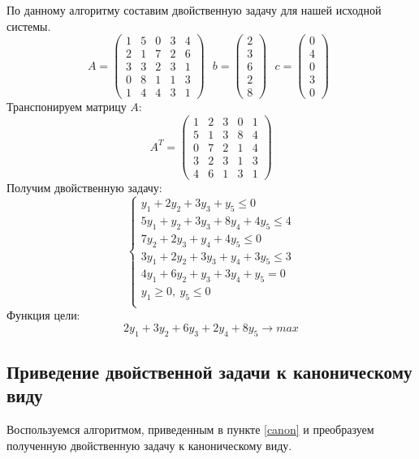 \documentclass{article}
\begin{document}
\noindent По данному алгоритму составим двойственную задачу для нашей исходной системы.
\begin{equation*}
A =
\begin{pmatrix}
1 & 5 & 0 & 3 & 4\\
2 & 1 & 7 & 2 & 6\\
3 & 3 & 2 & 3 & 1\\
0 & 8 & 1 & 1 & 3\\
1 & 4 & 4 & 3 & 1
\end{pmatrix} ~~~
b =
\begin{pmatrix}
2\\3\\6\\2\\8
\end{pmatrix} ~~~
c =
\begin{pmatrix}
0\\4\\0\\3\\0
\end{pmatrix} ~~
\end{equation*}
Транспонируем матрицу $A$:
\begin{equation*}
A^T = 
\begin{pmatrix}
1 & 2 & 3 & 0 & 1\\
5 & 1 & 3 & 8 & 4\\
0 & 7 & 2 & 1 & 4\\
3 & 2 & 3 & 1 & 3\\
4 & 6 & 1 & 3 & 1
\end{pmatrix}
\end{equation*}
Получим двойственную задачу:
\begin{equation*}
 \begin{cases}
  y_1 + 2y_2 + 3y_3 + y_5 \le 0\\
  5y_1 + y_2 + 3y_3 + 8y_4 + 4y_5 \le 4\\
  7y_2 + 2y_3 + y_4 + 4y_5 \le 0\\
  3y_1 + 2y_2 + 3y_3 + y_4 + 3y_5 \le 3\\
  4y_1 + 6y_2 + y_3 + 3y_4 + y_5 = 0\\
  y_1 \ge 0, ~y_5 \le 0\\
 \end{cases}
\end{equation*}
Функция цели: $$2y_1 + 3y_2 + 6y_3 + 2y_4 + 8y_5 \rightarrow max$$

\subsection{Приведение двойственной задачи к каноническому виду}
\noindent Воспользуемся алгоритмом, приведенным в пункте \eqref{canon} и преобразуем полученную двойственную задачу к каноническому виду.
\end{document}

